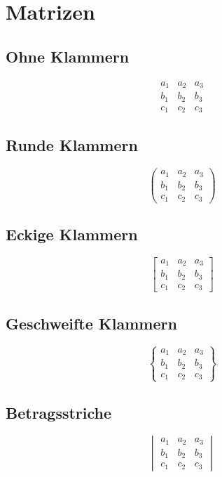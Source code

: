 \section{Matrizen}


\subsection{Ohne Klammern}
\begin{equation}
	\begin{matrix} a_1 & a_2 & a_3\\ b_1 & b_2 & b_3 \\ c_1 & c_2 & c_3 \end{matrix}
\end{equation}

\subsection{Runde Klammern}
\begin{equation}
	\begin{pmatrix} a_1 & a_2 & a_3\\ b_1 & b_2 & b_3 \\ c_1 & c_2 & c_3 \end{pmatrix}
\end{equation}

\subsection{Eckige Klammern}
\begin{equation}
	\begin{bmatrix} a_1 & a_2 & a_3\\ b_1 & b_2 & b_3 \\ c_1 & c_2 & c_3 \end{bmatrix}
\end{equation}

\subsection{Geschweifte Klammern}
\begin{equation}
	\begin{Bmatrix} a_1 & a_2 & a_3\\ b_1 & b_2 & b_3 \\ c_1 & c_2 & c_3 \end{Bmatrix}
\end{equation}

\subsection{Betragsstriche}
\begin{equation}
	\begin{vmatrix} a_1 & a_2 & a_3\\ b_1 & b_2 & b_3 \\ c_1 & c_2 & c_3 \end{vmatrix}
\end{equation}


